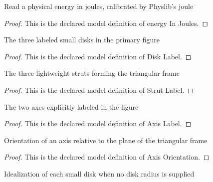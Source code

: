 \begin{definition}
  \label{def:physics:phyx-mini-0819:phyxminiproblems-problemphyxmini0819-energyinjoules}
  Read a physical energy in joules, calibrated by Physlib's joule
\end{definition}
\begin{proof}
  This is the declared model definition of energy In Joules.
\end{proof}
\begin{definition}
  \label{def:physics:phyx-mini-0819:phyxminiproblems-problemphyxmini0819-disklabel}
  The three labeled small disks in the primary figure
\end{definition}
\begin{proof}
  This is the declared model definition of Disk Label.
\end{proof}
\begin{definition}
  \label{def:physics:phyx-mini-0819:phyxminiproblems-problemphyxmini0819-strutlabel}
  The three lightweight struts forming the triangular frame
\end{definition}
\begin{proof}
  This is the declared model definition of Strut Label.
\end{proof}
\begin{definition}
  \label{def:physics:phyx-mini-0819:phyxminiproblems-problemphyxmini0819-axislabel}
  The two axes explicitly labeled in the figure
\end{definition}
\begin{proof}
  This is the declared model definition of Axis Label.
\end{proof}
\begin{definition}
  \label{def:physics:phyx-mini-0819:phyxminiproblems-problemphyxmini0819-axisorientation}
  Orientation of an axis relative to the plane of the triangular frame
\end{definition}
\begin{proof}
  This is the declared model definition of Axis Orientation.
\end{proof}
\begin{definition}
  \label{def:physics:phyx-mini-0819:phyxminiproblems-problemphyxmini0819-smalldiskmodel}
  Idealization of each small disk when no disk radius is supplied
\end{definition}
